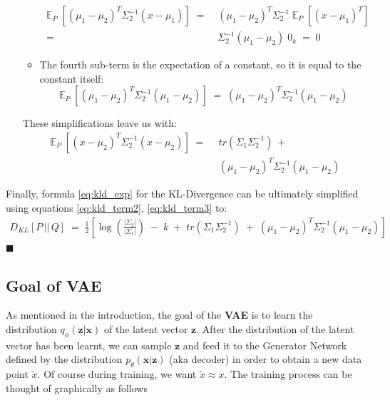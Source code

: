 \documentclass[12pt]{report}
\DeclareMathOperator{\E}{\mathbb{E}}
\newcommand*{\QEDA}{\hfill\ensuremath{\blacksquare}}
\begin{document}
\begin{itemize}
\begin{itemize}
\begin{align*}
                    \E_P \left[ (\mu_1 - \mu_2)^T\Sigma_2^{-1}(x - \mu_1) \right]
                    \;=&\; (\mu_1 - \mu_2)^T\Sigma_2^{-1}
                        \E_P \left[ (x - \mu_1)^T \right] \\
                    \;=&\; \Sigma_2^{-1}(\mu_1 - \mu_2) \; 0_k \;=\; 0
                \end{align*}
            \item The fourth sub-term is the expectation of a constant, so it is equal
                to the constant itself:
                $$\E_P \left[ (\mu_1 - \mu_2)^T\Sigma_2^{-1}(\mu_1 - \mu_2)\right] \;=\;
                (\mu_1 - \mu_2)^T\Sigma_2^{-1}(\mu_1 - \mu_2)$$
        \end{itemize}
    These simplifications leave us with:
    \begin{align}\label{eq:kld_term3}
        \E_P \left[ (x - \mu_2)^T\Sigma_2^{-1} (x - \mu_2) \right] \;=\;\,
        &tr(\Sigma_1\Sigma_2^{-1}) \,+ \nonumber \\
        &(\mu_1 - \mu_2)^T\Sigma_2^{-1}(\mu_1 - \mu_2)
    \end{align}
\end{itemize}

\noindent Finally, formula \eqref{eq:kld_exp} for the KL-Divergence can be ultimately
simplified using equations \eqref{eq:kld_term2}, \eqref{eq:kld_term3} to:
\begin{align}\label{eq:kld_gauss}
    D_{KL} \left[ P \,||\, Q \right] \;=\;
    \frac{1}{2}\left[ \log\left(\frac{|\Sigma_2|}{|\Sigma_1|}\right) \;-\;
    k \;+\;
    tr(\Sigma_1\Sigma_2^{-1}) \;+\; (\mu_1 - \mu_2)^T\Sigma_2^{-1}
        (\mu_1 - \mu_2) \right]
\end{align}
\QEDA
\clearpage

\subsection*{Goal of VAE}
As mentioned in the introduction, the goal of the \textbf{VAE} is to learn the
distribution $q_{\phi}(\textbf{z} | \textbf{x})$ of the latent vector $\textbf{z}$.
After the distribution of the latent vector has been learnt, we can sample
$\textbf{z}$ and feed it to the Generator Network defined by the distribution
$p_{\theta}(\textbf{x} | \textbf{z})$ (aka decoder) in order to obtain a new
data point $\tilde{x}$. Of course during training, we want $\tilde{x} \approx x$.
The training process can be thought of graphically as follows
\bigskip
\end{document}

